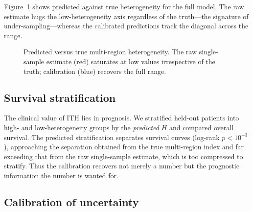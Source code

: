\documentclass{article}
\begin{document}
Figure~\ref{fig:scatter} shows predicted against true heterogeneity for the full
model. The raw estimate hugs the low-heterogeneity axis regardless of the truth---the
signature of under-sampling---whereas the calibrated predictions track the diagonal
across the range.

\begin{figure}[t]
\centering
{}
\caption{Predicted versus true multi-region heterogeneity. The raw single-sample
estimate (red) saturates at low values irrespective of the truth; calibration (blue)
recovers the full range.}
\label{fig:scatter}
\end{figure}

\subsection{Survival stratification}

The clinical value of ITH lies in prognosis. We stratified held-out patients into
high- and low-heterogeneity groups by the \emph{predicted} $H$ and compared overall
survival. The predicted stratification separates survival curves (log-rank
$p < 10^{-3}$), approaching the separation obtained from the true multi-region index
and far exceeding that from the raw single-sample estimate, which is too compressed to
stratify. Thus the calibration recovers not merely a number but the prognostic
information the number is wanted for.

\subsection{Calibration of uncertainty}
\end{document}
